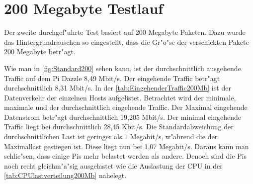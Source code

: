 \section{200 Megabyte Testlauf}
\label{sec:200MBTest}
Der zweite durchgef"uhrte Test basiert auf 200 Megabyte Paketen. Dazu wurde das Hintergrundrauschen %
so eingestellt, dass die Gr"o"se der verschickten Pakete 200 Megabyte betr"agt. 

Wie man in \cref{fig:Standard200} sehen kann, ist der durchschnittlich ausgehende Traffic auf dem Pi Dazzle 8,49 Mbit/s. %
Der eingehende Traffic betr"agt durchschnittlich 8,31 Mbit/s. In der \cref{tab:EingehenderTraffic200Mb} %
ist der Datenverkehr der einzelnen Hosts aufgelistet. Betrachtet wird der minimale, maximale und der durchschnittlich eingehende Traffic. %
Der Maximal eingehende Datenstrom betr"agt durchschnittlich 19,205 Mbit/s. Der minimal eingehende Traffic liegt bei %
durchschnittlich 28,45 Kbit/s. Die Standardabweichung der durchschnittlichen Last ist geringer als 1 Megabit/s, %
w"ahrend die der Maximallast gestiegen ist. Diese liegt nun bei 1,07 Megabit/s. Daraus kann man schlie"sen, dass %
einige Pis mehr belastet werden als andere. Denoch sind die Pis noch recht gleichm"a"sig ausgelastet %
wie die Auslastung der CPU in der \cref{tab:CPUlastverteilung200Mb} nahelegt. 

